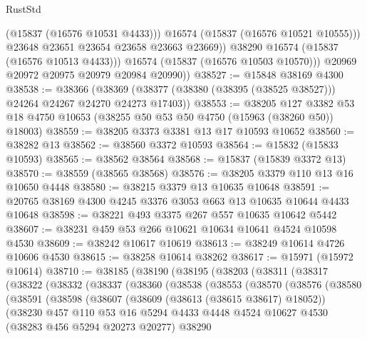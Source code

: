 \begin{lexlean}{RustStd}
\begin{coremodule}
                    (@15837 (@16576 @10531 @4433)))
                  @16574
                  (@15837 (@16576 @10521 @10555)))
                @23648
                @23651
                @23654
                @23658
                @23663
                @23669))
            @38290
            @16574
            (@15837 (@16576 @10513 @4433)))
          @16574
          (@15837 (@16576 @10503 @10570)))
        @20969
        @20972
        @20975
        @20979
        @20984
        @20990))
@38527 := @15848 @38169 @4300
@38538 := @38366
    (@38369 (@38377 (@38380 (@38395 (@38525 @38527))) @24264 @24267 @24270 @24273 @17403))
@38553 := @38205
    @127
    @3382
    @53
    @18
    @4750
    @10653
    (@38255 @50 @53 @50 @4750 (@15963 (@38260 @50)) @18003)
@38559 := @38205 @3373 @3381 @13 @17 @10593 @10652
@38560 := @38282 @13
@38562 := @38560 @3372 @10593
@38564 := @15832 (@15833 @10593)
@38565 := @38562 @38564
@38568 := @15837 (@15839 @3372 @13)
@38570 := @38559 (@38565 @38568)
@38576 := @38205 @3379 @110 @13 @16 @10650 @4448
@38580 := @38215 @3379 @13 @10635 @10648
@38591 := @20765 @38169 @4300 @4245 @3376 @3053 @663 @13 @10635 @10644 @4433 @10648
@38598 := @38221 @493 @3375 @267 @557 @10635 @10642 @5442
@38607 := @38231 @459 @53 @266 @10621 @10634 @10641 @4524 @10598 @4530
@38609 := @38242 @10617 @10619
@38613 := @38249 @10614 @4726 @10606 @4530
@38615 := @38258 @10614 @38262
@38617 := @15971 (@15972 @10614)
@38710 := @38185
    (@38190
      (@38195
        (@38203
          (@38311
            (@38317
              (@38322
                (@38332
                  (@38337
                    (@38360
                      (@38538
                        (@38553
                          (@38570
                            (@38576
                              (@38580
                                (@38591
                                  (@38598
                                    (@38607
                                      (@38609 (@38613 (@38615 @38617) @18052))
                                      (@38230
                                        @457
                                        @110
                                        @53
                                        @16
                                        @5294
                                        @4433
                                        @4448
                                        @4524
                                        @10627
                                        @4530
                                        (@38283 @456 @5294 @20273 @20277)
                                        @38290

\end{coremodule}
\end{lexlean}
